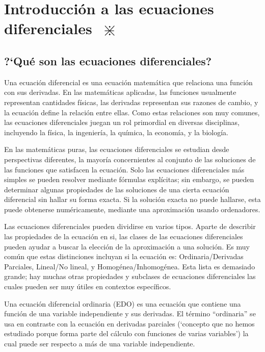\chapter{Introducción a las ecuaciones diferenciales $\; \divideontimes$}

\section{?`Qué son las ecuaciones diferenciales?}

Una ecuación diferencial es una ecuación matemática que relaciona una función con sus derivadas. En las matemáticas aplicadas, las funciones usualmente representan cantidades físicas, las derivadas representan sus razones de cambio, y la ecuación define la relación entre ellas. Como estas relaciones son muy comunes, las ecuaciones diferenciales juegan un rol primordial en diversas disciplinas, incluyendo la física, la ingeniería, la química, la economía, y la biología.

En las matemáticas puras, las ecuaciones diferenciales se estudian desde perspectivas diferentes, la mayoría concernientes al conjunto de las soluciones de las funciones que satisfacen la ecuación. Solo las ecuaciones diferenciales más simples se pueden resolver mediante fórmulas explícitas; sin embargo, se pueden determinar algunas propiedades de las soluciones de una cierta ecuación diferencial sin hallar su forma exacta. Si la solución exacta no puede hallarse, esta puede obtenerse numéricamente, mediante una aproximación usando ordenadores. 

Las ecuaciones diferenciales pueden dividirse en varios tipos. Aparte de describir las propiedades de la ecuación en si, las clases de las ecuaciones diferenciales pueden ayudar a buscar la elección de la aproximación a una solución. Es muy común que estas distinciones incluyan si la ecuación es: Ordinaria/Derivadas Parciales, Lineal/No lineal, y Homogénea/Inhomogénea. Esta lista es demasiado grande; hay muchas otras propiedades y subclases de ecuaciones diferenciales las cuales pueden ser muy útiles en contextos específicos.

Una ecuación diferencial ordinaria (EDO) es una ecuación que contiene una función de una variable independiente y sus derivadas. El término ``ordinaria'' se usa en contraste con la ecuación en derivadas parciales (`concepto que no hemos estudiado porque forma parte del cálculo con funciones de varias variables') la cual puede ser respecto a más de una variable independiente.

